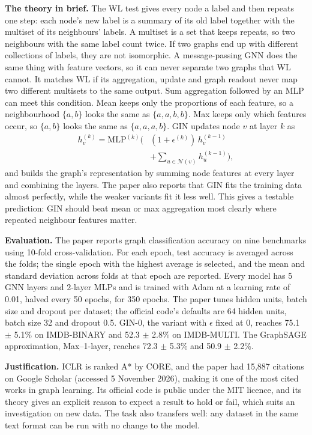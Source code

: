 \documentclass[11pt]{article}
\begin{document}
\textbf{The theory in brief.} The WL test gives every node a label and then repeats one step: each node's new label is a summary of its old label together with the multiset of its neighbours' labels. A multiset is a set that keeps repeats, so two neighbours with the same label count twice. If two graphs end up with different collections of labels, they are not isomorphic. A message-passing GNN does the same thing with feature vectors, so it can never separate two graphs that WL cannot. It matches WL if its aggregation, update and graph readout never map two different multisets to the same output. Sum aggregation followed by an MLP can meet this condition. Mean keeps only the proportions of each feature, so a neighbourhood $\{a, b\}$ looks the same as $\{a, a, b, b\}$. Max keeps only which features occur, so $\{a, b\}$ looks the same as $\{a, a, a, b\}$. GIN updates node $v$ at layer $k$ as
\begin{equation*}
\begin{aligned}
h_v^{(k)} = \mathrm{MLP}^{(k)}\big(&(1+\epsilon^{(k)})\, h_v^{(k-1)} \\
&+ \textstyle\sum_{u \in \mathcal{N}(v)} h_u^{(k-1)}\big),
\end{aligned}
\end{equation*}
and builds the graph's representation by summing node features at every layer and combining the layers. The paper also reports that GIN fits the training data almost perfectly, while the weaker variants fit it less well. This gives a testable prediction: GIN should beat mean or max aggregation most clearly where repeated neighbour features matter.

\textbf{Evaluation.} The paper reports graph classification accuracy on nine benchmarks using 10-fold cross-validation. For each epoch, test accuracy is averaged across the folds; the single epoch with the highest average is selected, and the mean and standard deviation across folds at that epoch are reported. Every model has 5 GNN layers and 2-layer MLPs and is trained with Adam at a learning rate of 0.01, halved every 50 epochs, for 350 epochs. The paper tunes hidden units, batch size and dropout per dataset; the official code's defaults are 64 hidden units, batch size 32 and dropout 0.5. GIN-0, the variant with $\epsilon$ fixed at 0, reaches 75.1 $\pm$ 5.1\% on IMDB-BINARY and 52.3 $\pm$ 2.8\% on IMDB-MULTI. The GraphSAGE approximation, Max--1-layer, reaches 72.3 $\pm$ 5.3\% and 50.9 $\pm$ 2.2\%.

\textbf{Justification.} ICLR is ranked A* by CORE, and the paper had 15,887 citations on Google Scholar (accessed 5 November 2026), making it one of the most cited works in graph learning. Its official code is public under the MIT licence, and its theory gives an explicit reason to expect a result to hold or fail, which suits an investigation on new data. The task also transfers well: any dataset in the same text format can be run with no change to the model.
\end{document}
